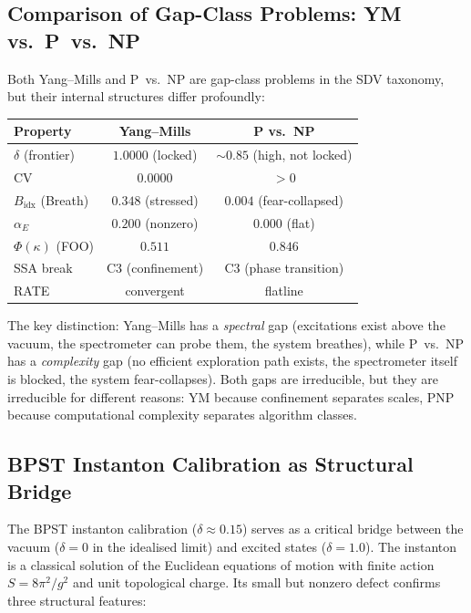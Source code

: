 \documentclass[11pt]{article}
\begin{document}
\subsection{Comparison of Gap-Class Problems: YM vs.\ P~vs.~NP}

Both Yang--Mills and P~vs.~NP are gap-class problems in the SDV
taxonomy, but their internal structures differ profoundly:

\begin{center}
\begin{tabular}{|l|c|c|}
\hline
\textbf{Property} & \textbf{Yang--Mills} & \textbf{P vs.\ NP} \\
\hline
$\delta$ (frontier) & $1.0000$ (locked) & $\sim 0.85$ (high, not locked) \\
$\mathrm{CV}$ & $0.0000$ & $> 0$ \\
$B_{\mathrm{idx}}$ (Breath) & $0.348$ (stressed) & $0.004$ (fear-collapsed) \\
$\alpha_E$ & $0.200$ (nonzero) & $0.000$ (flat) \\
$\Phi(\kappa)$ (FOO) & $0.511$ & $0.846$ \\
SSA break & C3 (confinement) & C3 (phase transition) \\
RATE & convergent & flatline \\
\hline
\end{tabular}
\end{center}

\noindent
The key distinction: Yang--Mills has a \emph{spectral} gap (excitations
exist above the vacuum, the spectrometer can probe them, the system
breathes), while P~vs.~NP has a \emph{complexity} gap (no efficient
exploration path exists, the spectrometer itself is blocked, the system
fear-collapses).  Both gaps are irreducible, but they are irreducible
for different reasons: YM because confinement separates scales, PNP
because computational complexity separates algorithm classes.

\subsection{BPST Instanton Calibration as Structural Bridge}

The BPST instanton calibration ($\delta \approx 0.15$) serves as a
critical bridge between the vacuum ($\delta = 0$ in the idealised
limit) and excited states ($\delta = 1.0$).  The instanton is a
classical solution of the Euclidean equations of motion with finite
action $S = 8\pi^2/g^2$ and unit topological charge.  Its small but
nonzero defect confirms three structural features:
\end{document}
